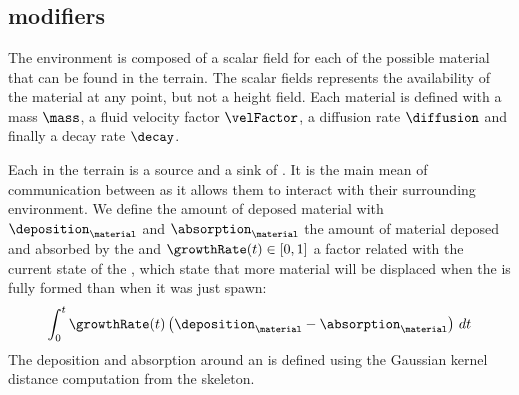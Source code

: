 



\section{}
\label{sec:semantic-representation_materials}

\subsection{ modifiers}
The environment is composed of a scalar field for each of the possible material that can be found in the terrain. The scalar fields represents the availability of the material at any point, but not a height field. Each material is defined with a mass $\mass$, a fluid velocity factor $\velFactor$, a diffusion rate $\diffusion$ and finally a decay rate $\decay$.

Each  in the terrain is a source and a sink of . It is the main mean of communication between  as it allows them to interact with their surrounding environment. We define the amount of deposed material with $\deposition_\material$ and $\absorption_\material$ the amount of material deposed and absorbed by the  and $\growthRate(t) \in [0, 1]$ a factor related with the current state of the , which state that more material will be displaced when the  is fully formed than when it was just spawn:
\begin{align*}
    \int_{0}^{t} {\growthRate(t) \left( \deposition_\material - \absorption_\material \right) \,dt}
\end{align*} 
The deposition and absorption around an  is defined using the Gaussian kernel distance computation from the skeleton.

